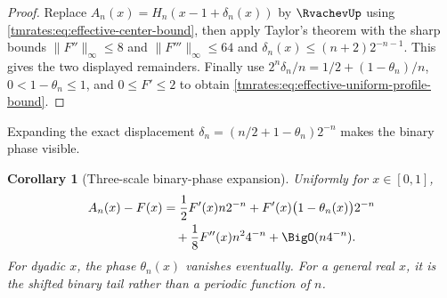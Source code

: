 \documentclass[11pt,oneside]{article}
\newtheorem{corollary}[corollary]{Corollary}
\theoremstyle{definition}
\theoremstyle{remark}
\begin{document}
\begin{proof}
Replace \(A_n(x)=H_n(x-1+\delta_n(x))\) by \(\RvachevUp\) using
\eqref{tmrates:eq:effective-center-bound}, then apply Taylor's theorem with the sharp
bounds \(\|F''\|_\infty\leq8\) and \(\|F'''\|_\infty\leq64\) and
\(\delta_n(x)\leq(n+2)2^{-n-1}\).  This gives the two displayed remainders.  Finally use
\(2^n\delta_n/n=1/2+(1-\theta_n)/n\), \(0<1-\theta_n\leq1\), and
\(0\leq F'\leq2\) to obtain \eqref{tmrates:eq:effective-uniform-profile-bound}.
\end{proof}

Expanding the exact displacement
$\delta_n=(n/2+1-\theta_n)2^{-n}$ makes the binary phase visible.
\begin{corollary}[Three-scale binary-phase expansion]
\label{tmrates:cor:binary-phase}
Uniformly for $x\in[0,1]$,
\begin{align}
 A_n(x)-F(x)
 &=\frac12F'(x)n2^{-n}
   +F'(x)\bigl(1-\theta_n(x)\bigr)2^{-n}\notag\\
 &\quad+\frac18F''(x)n^2 4^{-n}+\BigO(n4^{-n}).
 \label{tmrates:eq:binary-phase-expansion}
\end{align}
For dyadic $x$, the phase $\theta_n(x)$ vanishes eventually.  For a general real
$x$, it is the shifted binary tail rather than a periodic function of $n$.
\end{corollary}
\end{document}

